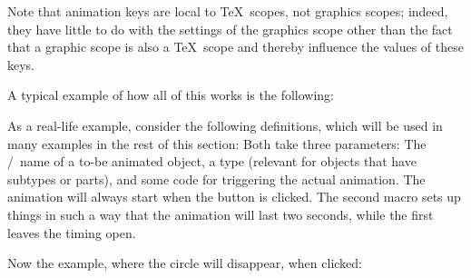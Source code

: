 \begin{command}{\pgfsys@animate{}}
\begin{enumerate}
            Note that animation keys are local to \TeX\ scopes, not graphics
            scopes; indeed, they have little to do with the settings of the
            graphics scope other than the fact that a graphic scope is also a
            \TeX\ scope and thereby influence the values of these keys.
    \end{enumerate}

    A typical example of how all of this works is the following:
\begin{codeexample}
\pgfsysanimkeyrepeatindefinite %
{
  \pgfsysanimkeywhom{\someid}{}%
}
{
  \pgfsysanimkeywhom{\someid}{}%
  \pgfsysanimvalcurrent %
  \pgfsysanimvaldimension{5pt} %
}
\end{codeexample}
    As a real-life example, consider the following definitions, which will be
    used in many examples in the rest of this section: Both take three
    parameters: The \pgfname/\tikzname\ name of a to-be animated object, a type
    (relevant for objects that have subtypes or parts), and some code for
    triggering the actual animation. The animation will always start when the
    button is clicked. The second macro sets up things in such a way that the
    animation will last two seconds, while the first leaves the timing open.
\begin{codeexample}
\def\animationexample#1#2#3{
  \tikz[fill=blue!25, draw=blue, ultra thick] {
    \pgfidrefnextuse{\objid}{#1}
    \pgfsysanimkeywhom{\objid}{#2}
    \pgfidrefnextuse{\nodeid}{node}
    \pgfsysanimkeyevent{\nodeid}{}{click}{}{begin}
    #3
    \node [font=\scriptsize, circle, fill, draw, align=center]
      (node) {Click \\ here};
  }
}
\end{codeexample}
    Now the example, where the circle will disappear, when clicked:
\begin{codeexample}[imagesource={standalone/pgfmanual-en-pgfsys-animations-animation-1.svg}]
\end{codeexample}
\end{command}

